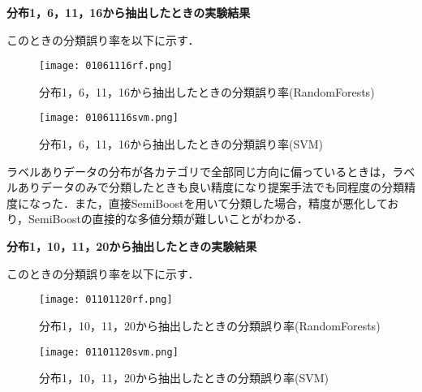 \begin{flushleft}
\large{\bfseries {分布1，6，11，16から抽出したときの実験結果}}
\end{flushleft}
このときの分類誤り率を以下に示す．

\begin{figure}[H]
\centering
\texttt{[image: 01061116rf.png]}
\caption{分布1，6，11，16から抽出したときの分類誤り率(RandomForests)}
\end{figure}\par

\begin{figure}[H]
\centering
\texttt{[image: 01061116svm.png]}
\caption{分布1，6，11，16から抽出したときの分類誤り率(SVM)}
\end{figure}\par

ラベルありデータの分布が各カテゴリで全部同じ方向に偏っているときは，ラベルありデータのみで分類したときも良い精度になり提案手法でも同程度の分類精度になった．また，直接SemiBoostを用いて分類した場合，精度が悪化しており，SemiBoostの直接的な多値分類が難しいことがわかる．

\begin{flushleft}
\large{\bfseries {分布1，10，11，20から抽出したときの実験結果}}
\end{flushleft}

このときの分類誤り率を以下に示す．
\begin{figure}[H]
\centering
\texttt{[image: 01101120rf.png]}
\caption{分布1，10，11，20から抽出したときの分類誤り率(RandomForests)}
\end{figure}\par

\begin{figure}[H]
\centering
\texttt{[image: 01101120svm.png]}
\caption{分布1，10，11，20から抽出したときの分類誤り率(SVM)}
\end{figure}\par

